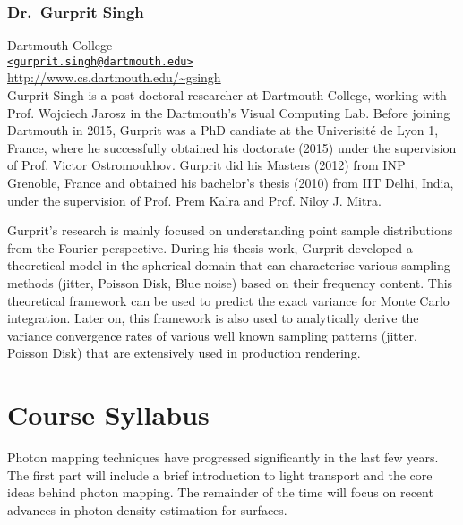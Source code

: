 \documentclass[11pt,fleqn]{book} %
\begin{document}
\subsection*{Dr.\ Gurprit Singh}
Dartmouth College\\
\href{mailto:gurprit.singh@dartmouth.edu}{\texttt{<gurprit.singh@dartmouth.edu>}}\\
\url{http://www.cs.dartmouth.edu/~gsingh}\\

Gurprit Singh is a post-doctoral researcher at Dartmouth College, working with Prof. Wojciech Jarosz in the Dartmouth's Visual Computing Lab. Before joining Dartmouth in 2015, Gurprit was a PhD candiate 
at the Univerisit\'{e} de Lyon 1, France, where he successfully obtained his doctorate (2015) under the 
supervision of Prof. Victor Ostromoukhov. Gurprit did his Masters (2012) from INP Grenoble, France and 
obtained his bachelor's thesis (2010) from IIT Delhi, India, under the supervision of Prof. Prem Kalra and Prof. Niloy J. Mitra.

Gurprit's research is mainly focused on understanding point sample distributions from the Fourier perspective. During his thesis work, Gurprit developed a theoretical model in the spherical domain that can characterise various sampling methods (jitter, Poisson Disk, Blue noise) based on their frequency content. This theoretical framework can be used to predict the exact variance for Monte Carlo integration. Later on, this framework is also used to analytically derive the variance convergence rates 
of various well known sampling patterns (jitter, Poisson Disk) that are extensively used in production rendering.
\cleardoublepage




{}
\chapter*{Course Syllabus}

Photon mapping techniques have progressed significantly in the last few years. The first part will include a brief introduction to light transport and the core ideas behind photon mapping. The remainder of the time will focus on recent advances in photon density estimation for surfaces.
\end{document}
